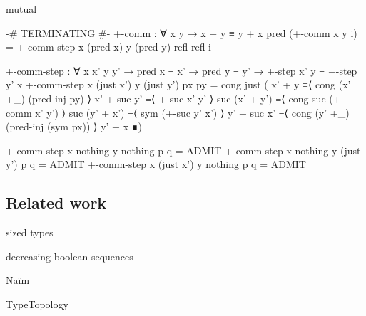 \begin{code}[hide]
mutual
\end{code}
\begin{code}
  {-# TERMINATING #-}
  +-comm : ∀ x y → x + y ≡ y + x
  pred (+-comm x y i) =
    +-comm-step x (pred x) y (pred y) refl refl i

  +-comm-step :
    ∀ x x' y y' → pred x ≡ x' → pred y ≡ y' →
    +-step x' y ≡ +-step y' x
  +-comm-step x (just x') y (just y') px py =
    cong just
      ( x' + y         ≡⟨ cong (x' +_) (pred-inj py) ⟩
        x' + suc y'    ≡⟨ +-suc x' y' ⟩
        suc (x' + y')  ≡⟨ cong suc (+-comm x' y') ⟩
        suc (y' + x')  ≡⟨ sym (+-suc y' x') ⟩
        y' + suc x'    ≡⟨ cong (y' +_) (pred-inj (sym px)) ⟩
        y' + x         ∎)
\end{code}
\begin{code}[hide]
  +-comm-step x nothing y nothing p q = ADMIT
  +-comm-step x nothing y (just y') p q = ADMIT
  +-comm-step x (just x') y nothing p q = ADMIT
\end{code}

\subsection{Related work}

sized types

decreasing boolean sequences

Naïm

TypeTopology
